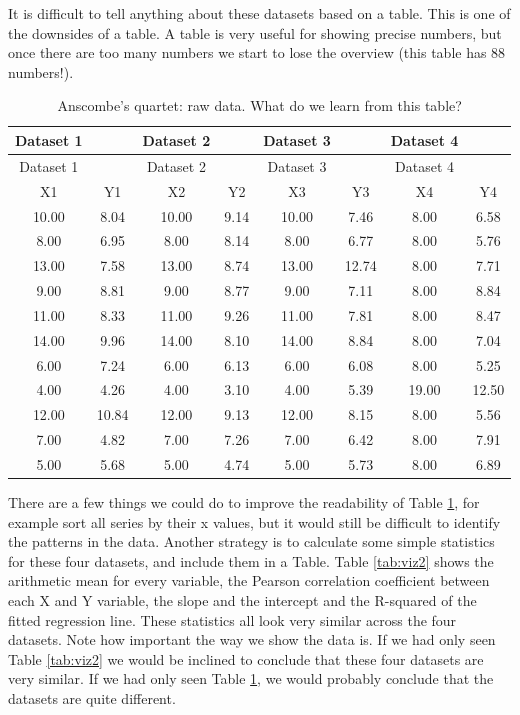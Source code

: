 \documentclass[
]{book}
\begin{document}
It is difficult to tell anything about these datasets based on a table. This is one of the downsides of a table. A table is very useful for showing precise numbers, but once there are too many numbers we start to lose the overview (this table has 88 numbers!).

\begin{longtable}[]{@{}cccccccc@{}}
\caption{\label{tab:viz1} Anscombe's quartet: raw data. What do we learn from this table?}\tabularnewline
\toprule
Dataset 1 & & Dataset 2 & & Dataset 3 & & Dataset 4 & \\
\midrule
\endfirsthead
\toprule
Dataset 1 & & Dataset 2 & & Dataset 3 & & Dataset 4 & \\
\midrule
\endhead
X1 & Y1 & X2 & Y2 & X3 & Y3 & X4 & Y4 \\
10.00 & 8.04 & 10.00 & 9.14 & 10.00 & 7.46 & 8.00 & 6.58 \\
8.00 & 6.95 & 8.00 & 8.14 & 8.00 & 6.77 & 8.00 & 5.76 \\
13.00 & 7.58 & 13.00 & 8.74 & 13.00 & 12.74 & 8.00 & 7.71 \\
9.00 & 8.81 & 9.00 & 8.77 & 9.00 & 7.11 & 8.00 & 8.84 \\
11.00 & 8.33 & 11.00 & 9.26 & 11.00 & 7.81 & 8.00 & 8.47 \\
14.00 & 9.96 & 14.00 & 8.10 & 14.00 & 8.84 & 8.00 & 7.04 \\
6.00 & 7.24 & 6.00 & 6.13 & 6.00 & 6.08 & 8.00 & 5.25 \\
4.00 & 4.26 & 4.00 & 3.10 & 4.00 & 5.39 & 19.00 & 12.50 \\
12.00 & 10.84 & 12.00 & 9.13 & 12.00 & 8.15 & 8.00 & 5.56 \\
7.00 & 4.82 & 7.00 & 7.26 & 7.00 & 6.42 & 8.00 & 7.91 \\
5.00 & 5.68 & 5.00 & 4.74 & 5.00 & 5.73 & 8.00 & 6.89 \\
\bottomrule
\end{longtable}

There are a few things we could do to improve the readability of Table \ref{tab:viz1}, for example sort all series by their x values, but it would still be difficult to identify the patterns in the data. Another strategy is to calculate some simple statistics for these four datasets, and include them in a Table. Table \ref{tab:viz2} shows the arithmetic mean for every variable, the Pearson correlation coefficient between each X and Y variable, the slope and the intercept and the R-squared of the fitted regression line. These statistics all look very similar across the four datasets. Note how important the way we show the data is. If we had only seen Table \ref{tab:viz2} we would be inclined to conclude that these four datasets are very similar. If we had only seen Table \ref{tab:viz1}, we would probably conclude that the datasets are quite different.
\end{document}
